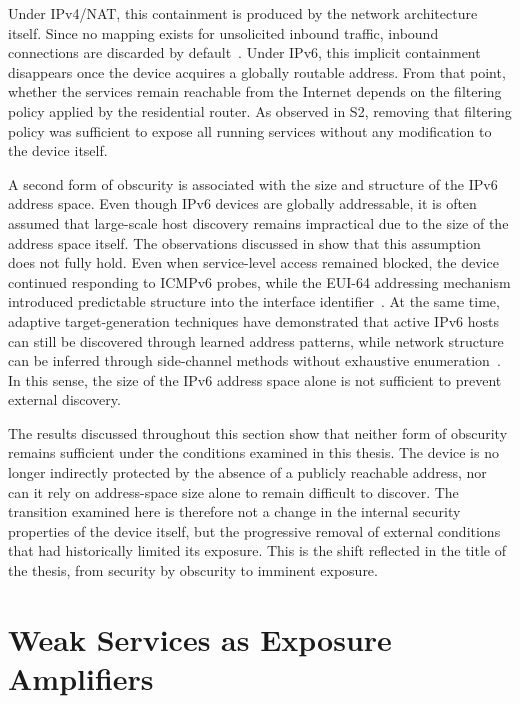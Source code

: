 Under IPv4/NAT, this containment is produced by the network architecture itself. Since no mapping exists for unsolicited inbound traffic, inbound connections are discarded by default~\cite{rfc3022}. Under IPv6, this implicit containment disappears once the device acquires a globally routable address. From that point, whether the services remain reachable from the Internet depends on the filtering policy applied by the residential router. As observed in S2, removing that filtering policy was sufficient to expose all running services without any modification to the device itself.

A second form of obscurity is associated with the size and structure of the IPv6 address space. Even though IPv6 devices are globally addressable, it is often assumed that large-scale host discovery remains impractical due to the size of the address space itself. The observations discussed in  show that this assumption does not fully hold. Even when service-level access remained blocked, the device continued responding to ICMPv6 probes, while the EUI-64 addressing mechanism introduced predictable structure into the interface identifier~\cite{rye2023ipvseeyou}. At the same time, adaptive target-generation techniques have demonstrated that active IPv6 hosts can still be discovered through learned address patterns, while network structure can be inferred through side-channel methods without exhaustive enumeration~\cite{williams20246sense,pan2023router}. In this sense, the size of the IPv6 address space alone is not sufficient to prevent external discovery.

The results discussed throughout this section show that neither form of obscurity remains sufficient under the conditions examined in this thesis. The device is no longer indirectly protected by the absence of a publicly reachable address, nor can it rely on address-space size alone to remain difficult to discover. The transition examined here is therefore not a change in the internal security properties of the device itself, but the progressive removal of external conditions that had historically limited its exposure. This is the shift reflected in the title of the thesis, from security by obscurity to imminent exposure.

\section{Weak Services as Exposure Amplifiers}\label{sec:discussion-weak-services}

